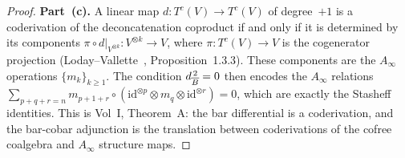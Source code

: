 \begin{proof}
\textbf{Part~(c).}
A linear map $d\colon T^c(V) \to T^c(V)$ of degree~$+1$ is a
coderivation of the deconcatenation coproduct if and only if it is
determined by its components $\pi \circ d|_{V^{\otimes k}} \colon
V^{\otimes k} \to V$, where $\pi\colon T^c(V) \to V$ is the
cogenerator projection (Loday--Vallette~\cite{LV12},
Proposition~1.3.3). These components are the
$A_\infty$ operations $\{m_k\}_{k \geq 1}$. The condition
$d_{\overline{B}}^{\,2} = 0$ then encodes the $A_\infty$ relations
$\sum_{p+q+r=n} m_{p+1+r} \circ (\mathrm{id}^{\otimes p} \otimes
m_q \otimes \mathrm{id}^{\otimes r}) = 0$, which are exactly the
Stasheff identities. This is Vol~I, Theorem~A: the bar differential
is a coderivation, and the bar-cobar adjunction is the translation
between coderivations of the cofree coalgebra and $A_\infty$
structure maps.
\end{proof}


